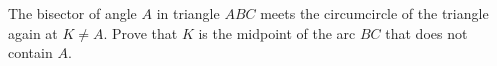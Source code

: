 The bisector of angle $A$ in triangle $ABC$ meets the circumcircle of the triangle again at $K\ne A$. Prove that $K$ is the midpoint of the arc $BC$ that does not contain $A$.
